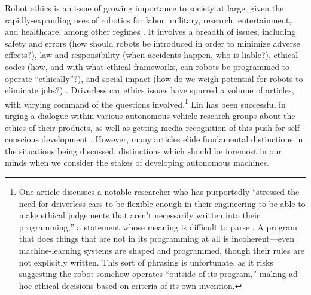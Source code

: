 



Robot ethics is an issue of growing importance to society at
large, given the rapidly-expanding uses of robotics for labor, military,
research, entertainment, and healthcare, among other regimes \cite[p.
  5-6]{patrickLin}. It involves a breadth of issues,
including safety and errors (how should 
robots be introduced in order to minimize adverse effects?), law and
responsibility (when accidents happen, who is liable?), ethical codes
(how, and with what ethical frameworks, can robots be programmed to
operate ``ethically''?), and social impact
(how do we weigh potential for robots to eliminate
jobs?) \cite{robotEthics}. Driverless car ethics issues have spurred a
volume of articles, 
with varying command of the questions
involved.\footnote{One article discusses a notable
  researcher who has purportedly ``stressed the need for driverless
  cars to be flexible enough in their 
engineering to be able to make ethical judgements that aren't
necessarily written into their programming,'' a statement whose
meaning is difficult to parse \cite{jessicaDavies}. A
program that does things that are not in its programming at all is
incoherent---even machine-learning systems are shaped and programmed,
though their rules are not explicitly written. This sort of phrasing is unfortunate, as it 
risks suggesting the robot somehow operates ``outside of its
program,'' making ad-hoc ethical decisions based on criteria of its
own invention.} Lin has been successful in urging a dialogue
within various autonomous vehicle research groups about the ethics of
their products, as well as getting media recognition of this push for
self-conscious development \cite{timeEthics}. However, many articles
elide fundamental distinctions in the situations being discussed,
distinctions which should be foremost in our minds when we consider
the stakes of developing autonomous machines.

